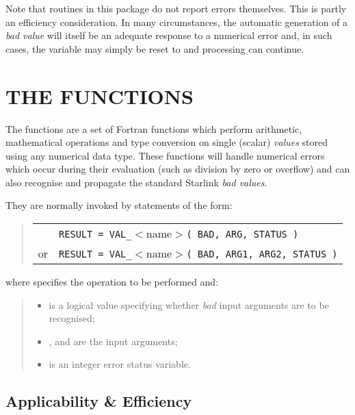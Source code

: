 Note that routines in this package do not report errors themselves.
This is partly an efficiency consideration.
In many circumstances, the automatic generation of a {\em bad value} will
itself be an adequate response to a numerical error and, in such cases, the
 variable may simply be reset to  and
processing can continue. 

\section{THE  FUNCTIONS}

\label{section:val}

The  functions are a set of Fortran functions which perform
arithmetic, mathematical operations and type conversion on single (scalar)
{\em values} stored using any numerical data type. 
These functions will handle numerical errors which occur during their
evaluation (such as division by zero or overflow) and can also recognise and
propagate the standard Starlink {\em bad values}. 

They are normally invoked by statements of the form:

\begin{quote}
\begin{tabular}{rl}
& \verb#RESULT = VAL_#$<$name$>$\verb#( BAD, ARG, STATUS )#\\
or & \verb#RESULT = VAL_#$<$name$>$\verb#( BAD, ARG1, ARG2, STATUS )#
\end{tabular}
\end{quote}

where  specifies the operation to be performed and:

\begin{quote}
\begin{itemize}

\item {} is a logical value specifying whether {\em bad}
input arguments are to be recognised;

\item {},  and  are the input
arguments; 

\item {} is an integer error status variable.

\end{itemize}
\end{quote}

\subsection{Applicability \& Efficiency}


